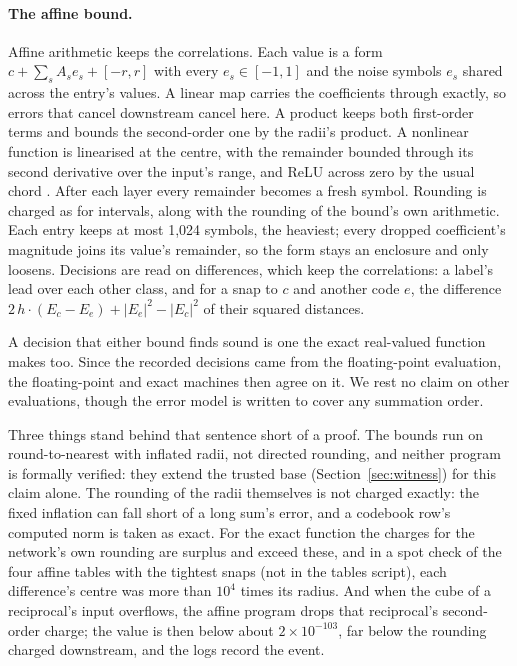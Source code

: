 \documentclass[11pt]{article}
\newcommand{\pn}[2]{#2}
\theoremstyle{definition}
\begin{document}
\paragraph{The affine bound.} Affine arithmetic \citep{de-figueiredo-2004-affine-arithmetic-concepts-applications}
keeps the correlations. Each value is a form $c + \sum_s A_s e_s + [-r, r]$ with every $e_s \in [-1, 1]$
and the noise symbols $e_s$ shared across the entry's values. A linear map carries the coefficients
through exactly, so errors that cancel downstream cancel here. A product keeps both first-order terms
and bounds the second-order one by the radii's product. A nonlinear function is linearised at the
centre, with the remainder bounded through its second derivative over the input's range, and ReLU
across zero by the usual chord \citep{singh-2018-fast-effective-robustness-certification}. After each layer every remainder becomes a fresh symbol. Rounding is
charged as for intervals, along with the rounding of the bound's own arithmetic. Each entry keeps at
most \pn{affine-cap}{1{,}024} symbols, the heaviest; every dropped coefficient's magnitude joins its
value's remainder, so the form stays an enclosure and only loosens. Decisions are read on differences,
which keep the correlations: a label's lead over each other class, and for a snap to $c$ and another
code $e$, the difference $2\,h \cdot (E_c - E_e) + |E_e|^2 - |E_c|^2$ of their squared distances.

A decision that either bound finds sound is one the exact real-valued function makes too. Since the
recorded decisions came from the floating-point evaluation, the floating-point and exact machines then
agree on it. We rest no claim on other evaluations, though the error model is written to cover any
summation order.

Three things stand behind that sentence short of a proof. The bounds run on round-to-nearest with
inflated radii, not directed rounding, and neither program is formally verified: they extend the trusted
base (Section~\ref{sec:witness}) for this claim alone. The rounding of the radii themselves is not
charged exactly: the fixed inflation can fall short of a long sum's error, and a codebook row's computed
norm is taken as exact. For the exact function the charges for the network's own rounding are surplus and
exceed these, and in a spot check of the four affine tables with the tightest snaps (not in the tables
script), each difference's centre was more than $10^4$ times its radius. And when the cube of a reciprocal's
input overflows, the affine program drops that reciprocal's second-order charge; the value is then below
about $2 \times 10^{-103}$, far below the rounding charged downstream, and the logs record the event.
\end{document}
